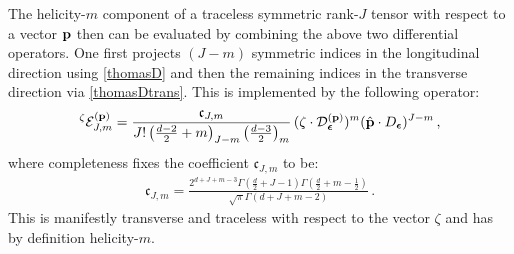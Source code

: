 \documentclass[11pt,a4paper]{article}
\begin{document}
The helicity-$m$ component of a traceless symmetric rank-$J$ tensor with respect to a vector ${\bf p}$ then can be evaluated by combining the above two differential operators. One first projects $\left(J-m\right)$ symmetric indices in the longitudinal direction using \eqref{thomasD} and then the remaining indices in the transverse direction via \eqref{thomasDtrans}. This is implemented by the following operator:
\begin{align}\label{helicity_proj}
    {}^{\zeta}\mathcal{E}^{\left({\bf p}\right)}_{J,m}=\frac{\mathfrak{c}_{J,m}}{J!\left(\tfrac{d-2}2+m\right)_{J-m}\left(\tfrac{d-3}2\right)_{m}}\,(\zeta\cdot \mathcal{D}_{\boldsymbol{\epsilon}}^{\left({\bf p}\right)})^{m}(\hat{{\bf p}}\cdot D_{\boldsymbol{\epsilon}})^{J-m}\,,
\end{align}
where completeness fixes the coefficient $\mathfrak{c}_{J,m}$ to be:
\begin{align}
    \mathfrak{c}_{J,m}=\frac{2^{d+J+m-3} \Gamma \left(\tfrac{d}{2}+J-1\right) \Gamma \left(\tfrac{d}{2}+m-\frac{1}{2}\right)}{\sqrt{\pi } \Gamma (d+J+m-2)}\,.
\end{align}
This is manifestly transverse and traceless with respect to the vector $\zeta$ and has by definition helicity-$m$.
\end{document}
